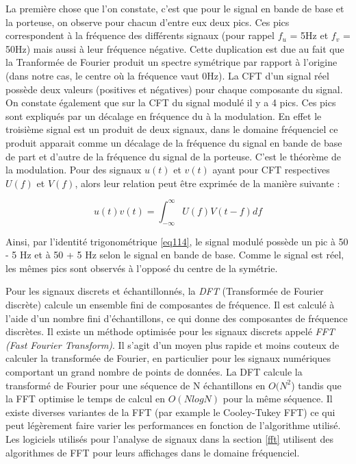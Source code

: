 La première chose que l'on constate, c'est que pour le signal en bande de base et la porteuse, on observe pour chacun d'entre eux deux pics. Ces pics correspondent à la fréquence des différents signaux (pour rappel $f_u$ = 5Hz et $f_v$ = 50Hz) mais aussi à leur fréquence négative. Cette duplication est due au fait que la Tranformée de Fourier produit un spectre symétrique par rapport à l'origine (dans notre cas, le centre où la fréquence vaut 0Hz). La CFT d'un signal réel possède deux valeurs (positives et négatives) pour chaque composante du signal. On constate également que sur la CFT du signal modulé il y a 4 pics. Ces pics sont expliqués par un décalage en fréquence du à la modulation. En effet le troisième signal est un produit de deux signaux, dans le domaine fréquenciel ce produit apparait comme un décalage de la fréquence du signal en bande de base de part et d'autre de la fréquence du signal de la porteuse. C'est le théorème de la modulation. Pour des signaux $u(t)$ et $v(t)$ ayant pour CFT respectives $U(f)$ et $V(f)$, alors leur relation peut être exprimée de la manière suivante :

\begin{equation}
u(t)v(t) = \int_{-\infty}^{\infty} U(f)V(t - f) df
\end{equation}

Ainsi, par l'identité trigonométrique \ref{eq114}, le signal modulé possède un pic à 50 - 5 Hz et à 50 + 5 Hz selon le signal en bande de base. Comme le signal est réel, les mêmes pics sont observés à l'opposé du centre de la symétrie.

\vspace{0.1cm}

Pour les signaux discrets et échantillonnés, la \textit{DFT} (Transformée de Fourier discrète) calcule un ensemble fini de composantes de fréquence. Il est calculé à l’aide d’un nombre fini d’échantillons, ce qui donne des composantes de fréquence discrètes. Il existe un méthode optimisée pour les signaux discrets appelé \textit{FFT (Fast Fourier Transform)}\cite{fft}. Il s'agit d'un moyen plus rapide et moins couteux de calculer la transformée de Fourier, en particulier pour les signaux numériques comportant un grand nombre de points de données. La DFT calcule la transformé de Fourier pour une séquence de N échantillons en $O(N^2$) tandis que la FFT optimise le temps de calcul en $O(N log N)$ pour la même séquence. Il existe diverses variantes de la FFT (par example le Cooley-Tukey FFT\cite{fft1}) ce qui peut légèrement faire varier les performances en fonction de l'algorithme utilisé. Les logiciels utilisés pour l'analyse de signaux dans la section \ref{fft} utilisent des algorithmes de FFT pour leurs affichages dans le domaine fréquenciel.

